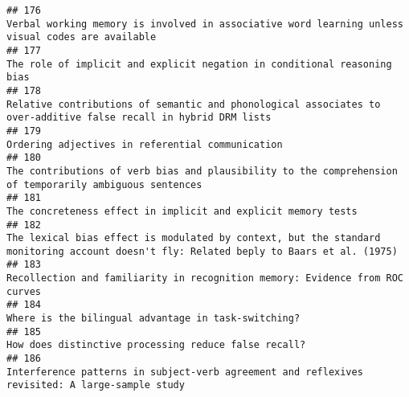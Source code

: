 \documentclass[
  english,
  man]{apa6}
\begin{document}
\begin{verbatim}
## 176                                                                                                                                         Verbal working memory is involved in associative word learning unless visual codes are available
## 177                                                                                                                                                                 The role of implicit and explicit negation in conditional reasoning bias
## 178                                                                                                                         Relative contributions of semantic and phonological associates to over-additive false recall in hybrid DRM lists
## 179                                                                                                                                                                                         Ordering adjectives in referential communication
## 180                                                                                                                                  The contributions of verb bias and plausibility to the comprehension of temporarily ambiguous sentences
## 181                                                                                                                                                                            The concreteness effect in implicit and explicit memory tests
## 182                                                                                                   The lexical bias effect is modulated by context, but the standard monitoring account doesn't fly: Related beply to Baars et al. (1975)
## 183                                                                                                                                                             Recollection and familiarity in recognition memory: Evidence from ROC curves
## 184                                                                                                                                                                                      Where is the bilingual advantage in task-switching?
## 185                                                                                                                                                                                     How does distinctive processing reduce false recall?
## 186                                                                                                                                           Interference patterns in subject-verb agreement and reflexives revisited: A large-sample study

\end{verbatim}
\end{document}
